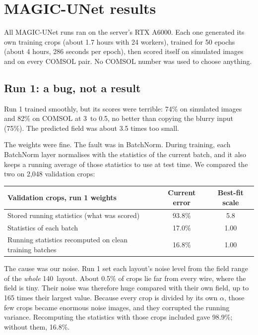 \chapter{MAGIC-UNet results}\label{ch:magic_results}

All MAGIC-UNet runs ran on the server's RTX A6000. Each one generated its own training crops (about 1.7 hours with 24
workers), trained for 50 epochs (about 4 hours, 286 seconds per epoch), then scored itself on simulated images and on every
COMSOL pair. No COMSOL number was used to choose anything.

\section{Run 1: a bug, not a result}

Run 1 trained smoothly, but its scores were terrible: 74\% on simulated images and 82\% on COMSOL at 3\um\ to 0.5\um,
no better than copying the blurry input (75\%). The predicted field was about 3.5 times too small.

The weights were fine. The fault was in BatchNorm. During training, each BatchNorm layer normalises with the statistics of
the current batch, and it also keeps a running average of those statistics to use at test time. We compared the two on
2,048 validation crops:

\begin{center}
\begin{tabular}{lcc}
\toprule
Validation crops, run 1 weights & Current error & Best-fit scale \\
\midrule
Stored running statistics (what was scored) & 93.8\% & 5.8 \\
Statistics of each batch & 17.0\% & 1.00 \\
Running statistics recomputed on clean training batches & 16.8\% & 1.00 \\
\bottomrule
\end{tabular}
\end{center}

The cause was our noise. Run 1 set each layout's noise level from the field range of the \emph{whole} 140\um\ layout.
About 0.5\% of crops lie far from every wire, where the field is tiny. Their noise was therefore huge compared with
their own field, up to 165 times their largest value. Because every crop is divided by its own $\alpha$, those few crops
became enormous noise images, and they corrupted the running variance. Recomputing the statistics with those crops
included gave 98.9\%; without them, 16.8\%.

